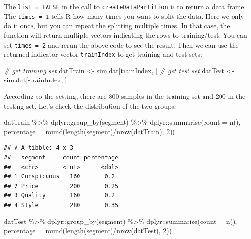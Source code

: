 \documentclass[
  12pt,
]{krantz}
\makeatletter
\newenvironment{Shaded}{\begin{snugshade}}{\end{snugshade}}
\newcommand{\AttributeTok}[1]{\textcolor[rgb]{0.61,0.61,0.61}{#1}}
\newcommand{\CommentTok}[1]{\textcolor[rgb]{0.37,0.37,0.37}{\textit{#1}}}
\newcommand{\DecValTok}[1]{\textcolor[rgb]{0.06,0.06,0.06}{#1}}
\newcommand{\FunctionTok}[1]{\textcolor[rgb]{0,0,0}{#1}}
\newcommand{\NormalTok}[1]{#1}
\newcommand{\OtherTok}[1]{\textcolor[rgb]{0.37,0.37,0.37}{#1}}
\newcommand{\SpecialCharTok}[1]{\textcolor[rgb]{0,0,0}{#1}}
\newenvironment{kframe}{%
\medskip{}
\setlength{\fboxsep}{.8em}
 \def\at@end@of@kframe{}%
 \ifinner\ifhmode%
  \def\at@end@of@kframe{\end{minipage}}%
  \begin{minipage}{\columnwidth}%
 \fi\fi%
 \def\FrameCommand##1{\hskip\@totalleftmargin \hskip-\fboxsep
 \colorbox{shadecolor}{##1}\hskip-\fboxsep
     \hskip-\linewidth \hskip-\@totalleftmargin \hskip\columnwidth}%
 \MakeFramed {\advance\hsize-\width
   \@totalleftmargin\z@ \linewidth\hsize
   \@setminipage}}%
 {\par\unskip\endMakeFramed%
 \at@end@of@kframe}
\renewenvironment{Shaded}{\begin{kframe}}{\end{kframe}}
\makeatother
\begin{document}
The \texttt{list\ =\ FALSE} in the call to \texttt{createDataPartition} is to return a data frame. The \texttt{times\ =\ 1} tells R how many times you want to split the data. Here we only do it once, but you can repeat the splitting multiple times. In that case, the function will return multiple vectors indicating the rows to training/test. You can set \texttt{times\ =\ 2} and rerun the above code to see the result. Then we can use the returned indicator vector \texttt{trainIndex} to get training and test sets:

\begin{Shaded}
\begin{Highlighting}[]
\CommentTok{\# get training set}
\NormalTok{datTrain }\OtherTok{\textless{}{-}}\NormalTok{ sim.dat[trainIndex, ]}
\CommentTok{\# get test set}
\NormalTok{datTest }\OtherTok{\textless{}{-}}\NormalTok{ sim.dat[}\SpecialCharTok{{-}}\NormalTok{trainIndex, ]}
\end{Highlighting}
\end{Shaded}

According to the setting, there are 800 samples in the training set and 200 in the testing set. Let's check the distribution of the two groups:

\begin{Shaded}
\begin{Highlighting}[]
\NormalTok{datTrain }\SpecialCharTok{\%\textgreater{}\%}
\NormalTok{  dplyr}\SpecialCharTok{::}\FunctionTok{group\_by}\NormalTok{(segment) }\SpecialCharTok{\%\textgreater{}\%}
\NormalTok{  dplyr}\SpecialCharTok{::}\FunctionTok{summarise}\NormalTok{(}\AttributeTok{count =} \FunctionTok{n}\NormalTok{(),}
            \AttributeTok{percentage =} \FunctionTok{round}\NormalTok{(}\FunctionTok{length}\NormalTok{(segment)}\SpecialCharTok{/}\FunctionTok{nrow}\NormalTok{(datTrain), }\DecValTok{2}\NormalTok{))}
\end{Highlighting}
\end{Shaded}

\begin{verbatim}
## # A tibble: 4 x 3
##   segment     count percentage
##   <chr>       <int>      <dbl>
## 1 Conspicuous   160       0.2 
## 2 Price         200       0.25
## 3 Quality       160       0.2 
## 4 Style         280       0.35
\end{verbatim}

\begin{Shaded}
\begin{Highlighting}[]
\NormalTok{datTest }\SpecialCharTok{\%\textgreater{}\%}
\NormalTok{  dplyr}\SpecialCharTok{::}\FunctionTok{group\_by}\NormalTok{(segment) }\SpecialCharTok{\%\textgreater{}\%}
\NormalTok{  dplyr}\SpecialCharTok{::}\FunctionTok{summarise}\NormalTok{(}\AttributeTok{count =} \FunctionTok{n}\NormalTok{(),}
            \AttributeTok{percentage =} \FunctionTok{round}\NormalTok{(}\FunctionTok{length}\NormalTok{(segment)}\SpecialCharTok{/}\FunctionTok{nrow}\NormalTok{(datTest), }\DecValTok{2}\NormalTok{))}
\end{Highlighting}
\end{Shaded}
\end{document}

